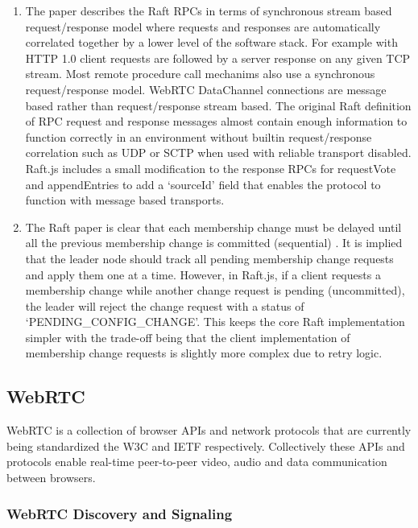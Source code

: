 \documentclass[9pt]{extarticle}
\begin{document}
\begin{multicols}{2}
\begin{enumerate}
\item The paper describes the Raft RPCs in terms of synchronous stream
    based request/response model where requests and responses are
    automatically correlated together by a lower level of the software
    stack. For example with HTTP 1.0 \cite{http:rfc1945} client
    requests are followed by a server response on any given TCP
    stream. Most remote procedure call mechanims also use
    a synchronous request/response model. %
    WebRTC DataChannel connections are message based rather than
    request/response stream based. %
    The original Raft definition of RPC request and response messages
    almost contain enough information to function correctly in an
    environment without builtin request/response correlation such as
    UDP or SCTP when used with reliable transport disabled. %
    Raft.js includes a small modification to the response RPCs for
    requestVote and appendEntries to add a `sourceId' field that
    enables the protocol to function with message based transports.
\item The Raft paper is clear that each membership change must be
    delayed until all the previous membership change is committed
    (sequential) \cite[Section~4.1]{raft_thesis:ongaro14}. It is
    implied that the leader node should track all pending membership
    change requests and apply them one at a time.  However, in
    Raft.js, if a client requests a membership change while another
    change request is pending (uncommitted), the leader will reject
    the change request with a status of `PENDING\_CONFIG\_CHANGE'.
    This keeps the core Raft implementation simpler with the trade-off
    being that the client implementation of membership change requests
    is slightly more complex due to retry logic.
\end{enumerate}

\subsection{WebRTC}

WebRTC is a collection of browser APIs \cite{webrtc:feb2015} and
network protocols \cite{draft-rtcweb-overview} that are currently
being standardized the W3C and IETF respectively. Collectively these
APIs and protocols enable real-time peer-to-peer video, audio and data
communication between browsers.

\subsubsection{WebRTC Discovery and Signaling}


\end{multicols}
\end{document}

